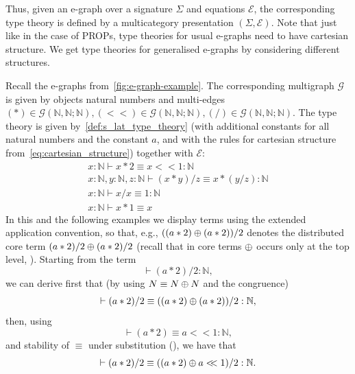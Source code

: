 Thus, given an e-graph over a signature $\Sigma$ and equations $\mathcal{E}$, the corresponding type theory is defined by a multicategory presentation $(\Sigma, \mathcal{E})$.
Note that just like in the case of PROPs, type theories for usual e-graphs need to have cartesian structure. 
We get type theories for generalised e-graphs by considering different structures.

\begin{example}
  Recall the e-graphs from~\autoref{fig:e-graph-example}.
  The corresponding multigraph $\mathcal{G}$ is given by objects natural numbers and multi-edges $(*) \in \mathcal{G}(\mathbb{N}, \mathbb{N}; \mathbb{N}), (<\!\!<) \in \mathcal{G}(\mathbb{N}, \mathbb{N}; \mathbb{N}), (/) \in \mathcal{G}(\mathbb{N}, \mathbb{N}; \mathbb{N})$.
  The type theory is given by~\autoref{def:s_lat_type_theory} (with additional constants for all natural numbers and the constant $a$, and with the rules for cartesian structure from~\autoref{eq:cartesian_structure}) together with $\mathcal{E}$:
  \begin{gather*}
    x : \mathbb{N} \vdash x * 2 \equiv x <\!\!< 1 : \mathbb{N}\\
    x : \mathbb{N}, y : \mathbb{N}, z : \mathbb{N} \vdash (x * y) / z \equiv x * (y / z) : \mathbb{N}\\
    x : \mathbb{N} \vdash x / x \equiv 1 : \mathbb{N}\\
    x : \mathbb{N} \vdash x * 1 \equiv x
  \end{gather*}
  In this and the following examples we display terms using the extended application convention, so that, e.g., $((a * 2) \mathbin{\oplus} (a * 2)) / 2$ denotes the distributed core term $(a * 2)/2 \mathbin{\oplus} (a * 2)/2$ (recall that in core terms $\mathbin{\oplus}$ occurs only at the top level, ).
  Starting from the term
  \[
  \vdash (a * 2) / 2 : \mathbb{N},
  \] 
  we can derive first that (by using $N \equiv N \mathbin{\oplus} N$ and the congruence)
  \[
  \vdash (a * 2) / 2 \equiv ((a * 2) \mathbin{\oplus} (a * 2)) / 2 : \mathbb{N},
  \]
  then, using
  \[
  \vdash (a * 2) \equiv a <\!\!< 1 : \mathbb{N},
  \]
  and stability of $\equiv$ under substitution (), we have that
  \[
  \vdash (a * 2) / 2 \equiv ((a * 2) \mathbin{\oplus} a <\!\!< 1) / 2 : \mathbb{N}.
  \]
\end{example}

